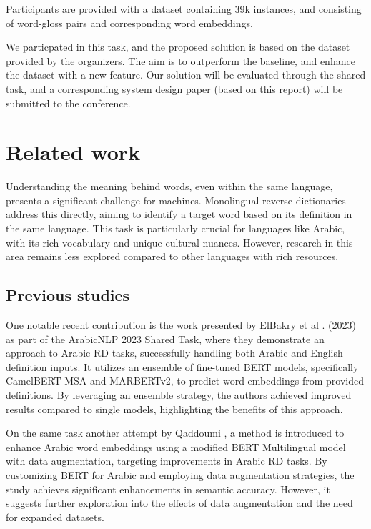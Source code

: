 \documentclass[12pt]{article}
\begin{document}
Participants are provided with a dataset containing 39k instances, and consisting of word-gloss pairs and corresponding word embeddings.

We particpated in this task, and the proposed solution is based on the dataset provided by the organizers. The aim is to outperform the baseline, and enhance the dataset with a new feature. Our solution will be evaluated through the shared task, and a corresponding system design paper (based on this report) will be submitted to the conference.

\newpage

\section{Related work}

Understanding the meaning behind words, even within the same language, presents a significant challenge for machines. Monolingual reverse dictionaries address this directly, aiming to identify a target word based on its definition in the same language. This task is particularly crucial for languages like Arabic, with its rich vocabulary and unique cultural nuances. However, research in this area remains less explored compared to other languages with rich resources.

\subsection{Previous studies}

One notable recent contribution is the work presented by ElBakry et al \cite{Albakry2023}. (2023) as part of the ArabicNLP 2023 Shared Task, where they demonstrate an approach to Arabic RD tasks, successfully handling both Arabic and English definition inputs. It utilizes an ensemble of fine-tuned BERT models, specifically CamelBERT-MSA and MARBERTv2, to predict word embeddings from provided definitions. By leveraging an ensemble strategy, the authors achieved improved results compared to single models, highlighting the benefits of this approach.

On the same task another attempt by Qaddoumi \cite{Qaddoumi2023}, a method is introduced to enhance Arabic word embeddings using a modified BERT Multilingual model with data augmentation, targeting improvements in Arabic RD tasks. By customizing BERT for Arabic and employing data augmentation strategies, the study achieves significant enhancements in semantic accuracy. However, it suggests further exploration into the effects of data augmentation and the need for expanded datasets.
\end{document}

